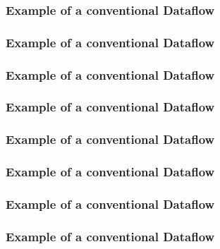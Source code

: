 \documentclass[aspectratio=169,10pt]{beamer}
\begin{document}
\begin{frame}
  \frametitle{Example of a conventional Dataflow}
  \begin{center}
    
  \end{center}
\end{frame}

\begin{frame}
  \frametitle{Example of a conventional Dataflow}
  \begin{center}
    
  \end{center}
\end{frame}

\begin{frame}
  \frametitle{Example of a conventional Dataflow}
  \begin{center}
    
  \end{center}
\end{frame}

\begin{frame}
  \frametitle{Example of a conventional Dataflow}
  \begin{center}
    
  \end{center}
\end{frame}

\begin{frame}
  \frametitle{Example of a conventional Dataflow}
  \begin{center}
    
  \end{center}
\end{frame}

\begin{frame}
  \frametitle{Example of a conventional Dataflow}
  \begin{center}
    
  \end{center}
\end{frame}

\begin{frame}
  \frametitle{Example of a conventional Dataflow}
  \begin{center}
    
  \end{center}
\end{frame}

\begin{frame}
  \frametitle{Example of a conventional Dataflow}
  \begin{center}
    
  \end{center}
\end{frame}
\end{document}
